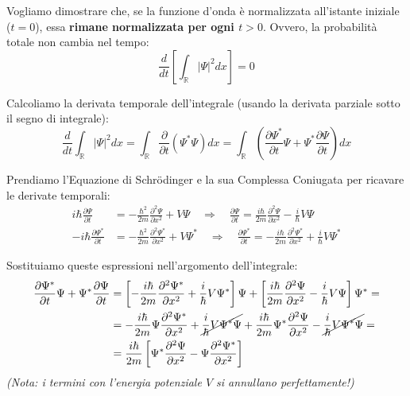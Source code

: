\documentclass[11pt, a4paper]{article}
\begin{document}
Vogliamo dimostrare che, se la funzione d'onda è normalizzata all'istante iniziale ($t=0$), essa \textbf{rimane normalizzata per ogni $t>0$}. Ovvero, la probabilità totale non cambia nel tempo: %
\begin{equation*}
    \frac{d}{dt} \left[ \int_{\mathbb{R}} |\Psi|^2 dx \right] = 0 %
\end{equation*}

\noindent
Calcoliamo la derivata temporale dell'integrale (usando la derivata parziale sotto il segno di integrale): %
\begin{equation}
    \frac{d}{dt} \int_{\mathbb{R}} |\Psi|^2 dx = \int_{\mathbb{R}} \frac{\partial}{\partial t} (\Psi^* \Psi) dx = \int_{\mathbb{R}} \left( \frac{\partial \Psi^*}{\partial t} \Psi + \Psi^* \frac{\partial \Psi}{\partial t} \right) dx %
\end{equation}

\noindent
Prendiamo l'Equazione di Schrödinger e la sua Complessa Coniugata per ricavare le derivate temporali: %
\begin{align*}
    i\hbar \frac{\partial \Psi}{\partial t} &= -\frac{\hbar^2}{2m} \frac{\partial^2 \Psi}{\partial x^2} + V\Psi \quad \Rightarrow \quad \frac{\partial \Psi}{\partial t} = \frac{i\hbar}{2m} \frac{\partial^2 \Psi}{\partial x^2} - \frac{i}{\hbar} V\Psi \\ %
    -i\hbar \frac{\partial \Psi^*}{\partial t} &= -\frac{\hbar^2}{2m} \frac{\partial^2 \Psi^*}{\partial x^2} + V\Psi^* \quad \Rightarrow \quad \frac{\partial \Psi^*}{\partial t} = -\frac{i\hbar}{2m} \frac{\partial^2 \Psi^*}{\partial x^2} + \frac{i}{\hbar} V\Psi^* %
\end{align*}

Sostituiamo queste espressioni nell'argomento dell'integrale: %
\begin{align*}
    \frac{\partial \Psi^*}{\partial t}\Psi + \Psi^*\frac{\partial \Psi}{\partial t} &= \left[ -\frac{i\hbar}{2m} \frac{\partial^2 \Psi^*}{\partial x^2} + \frac{i}{\hbar} V\Psi^* \right]\Psi + \left[ \frac{i\hbar}{2m} \frac{\partial^2 \Psi}{\partial x^2} - \frac{i}{\hbar} V\Psi \right]\Psi^* = \\ %
    &= -\frac{i\hbar}{2m} \Psi \frac{\partial^2 \Psi^*}{\partial x^2} + \cancel{\frac{i}{\hbar} V\Psi^*\Psi} + \frac{i\hbar}{2m} \Psi^* \frac{\partial^2 \Psi}{\partial x^2} - \cancel{\frac{i}{\hbar} V\Psi^*\Psi} = \\ %
    &= \frac{i\hbar}{2m} \left[ \Psi^* \frac{\partial^2 \Psi}{\partial x^2} - \Psi \frac{\partial^2 \Psi^*}{\partial x^2} \right] %
\end{align*}
\textit{(Nota: i termini con l'energia potenziale $V$ si annullano perfettamente!)} %
\end{document}
